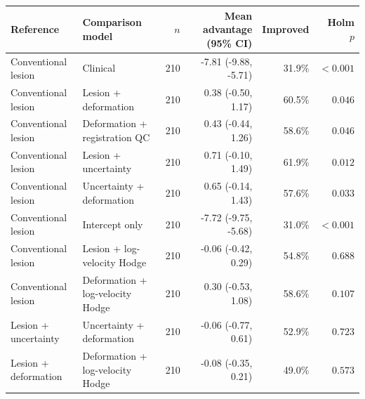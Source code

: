 \begin{tabular}{llrrrr}
\toprule
Reference & Comparison model & $n$ & Mean advantage (95\% CI) & Improved & Holm $p$ \\
\midrule
Conventional lesion & Clinical & 210 & -7.81 (-9.88, -5.71) & 31.9\% & \(<0.001\) \\
Conventional lesion & Lesion + deformation & 210 & 0.38 (-0.50, 1.17) & 60.5\% & \(0.046\) \\
Conventional lesion & Deformation + registration QC & 210 & 0.43 (-0.44, 1.26) & 58.6\% & \(0.046\) \\
Conventional lesion & Lesion + uncertainty & 210 & 0.71 (-0.10, 1.49) & 61.9\% & \(0.012\) \\
Conventional lesion & Uncertainty + deformation & 210 & 0.65 (-0.14, 1.43) & 57.6\% & \(0.033\) \\
Conventional lesion & Intercept only & 210 & -7.72 (-9.75, -5.68) & 31.0\% & \(<0.001\) \\
Conventional lesion & Lesion + log-velocity Hodge & 210 & -0.06 (-0.42, 0.29) & 54.8\% & \(0.688\) \\
Conventional lesion & Deformation + log-velocity Hodge & 210 & 0.30 (-0.53, 1.08) & 58.6\% & \(0.107\) \\
Lesion + uncertainty & Uncertainty + deformation & 210 & -0.06 (-0.77, 0.61) & 52.9\% & \(0.723\) \\
Lesion + deformation & Deformation + log-velocity Hodge & 210 & -0.08 (-0.35, 0.21) & 49.0\% & \(0.573\) \\
\bottomrule
\end{tabular}
